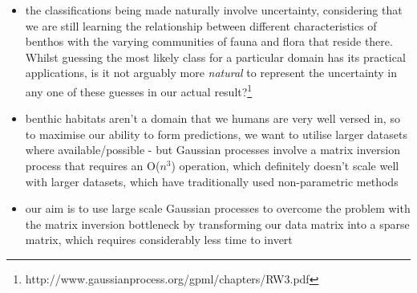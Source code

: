 \documentclass[12pt]{article}
\begin{document}
\begin{multicols}{2}
            \begin{itemize}
                \item the classifications being made naturally involve uncertainty, considering that we are still learning the relationship between different characteristics of benthos with the varying communities of fauna and flora that reside there. Whilst guessing the most likely class for a particular domain has its practical applications, is it not arguably more \textit{natural} to represent the uncertainty in any one of these guesses in our actual result?\footnote{http://www.gaussianprocess.org/gpml/chapters/RW3.pdf}
                \item benthic habitats aren't a domain that we humans are very well versed in, so to maximise our ability to form predictions, we want to utilise larger datasets where available/possible - but Gaussian processes involve a matrix inversion process that requires an O($n^3$) operation, which definitely doesn't scale well with larger datasets, which have traditionally used non-parametric methods
                \item our aim is to use large scale Gaussian processes to overcome the problem with the matrix inversion bottleneck by transforming our data matrix into a sparse matrix, which requires considerably less time to invert
            \end{itemize}



\end{multicols}
\end{document}
